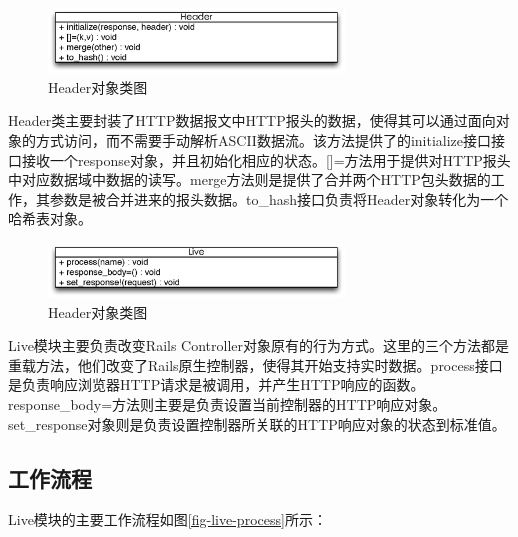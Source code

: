 \begin{figure}[h]
\centering
\includegraphics[width=0.7\textwidth]{images/detail/header_class.eps}
\caption{Header对象类图}
\label{fig-header-class}
\end{figure}

Header类主要封装了HTTP数据报文中HTTP报头的数据，使得其可以通过面向对象的方式访问，而不需要手动解析ASCII数据流。该方法提供了的initialize接口接口接收一个response对象，并且初始化相应的状态。[]=方法用于提供对HTTP报头中对应数据域中数据的读写。merge方法则是提供了合并两个HTTP包头数据的工作，其参数是被合并进来的报头数据。to\_hash接口负责将Header对象转化为一个哈希表对象。

\begin{figure}[h]
\centering
\includegraphics[width=0.7\textwidth]{images/detail/live_class.eps}
\caption{Header对象类图}
\label{fig-live-class}
\end{figure}

Live模块主要负责改变Rails Controller对象原有的行为方式。这里的三个方法都是重载方法，他们改变了Rails原生控制器，使得其开始支持实时数据。process接口是负责响应浏览器HTTP请求是被调用，并产生HTTP响应的函数。response\_body=方法则主要是负责设置当前控制器的HTTP响应对象。set\_response对象则是负责设置控制器所关联的HTTP响应对象的状态到标准值。

\subsection{工作流程}
Live模块的主要工作流程如图\ref{fig-live-process}所示：

